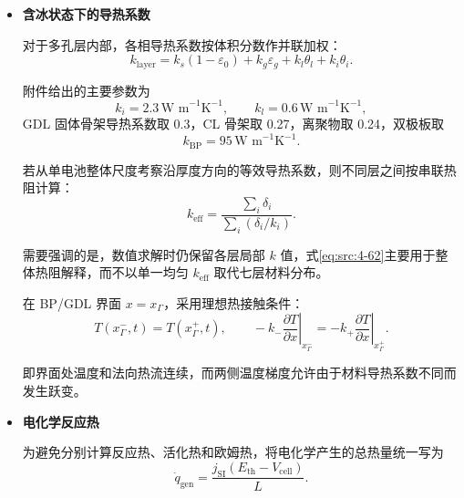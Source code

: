 \documentclass[bwprint]{gmcmthesis}
\numberwithin{equation}{section}
\numberwithin{figure}{section}
\begin{document}
\begin{itemize}
于是两侧双极板合计单位面积热容以及单电池完整热域单位面积热容分别为
\[
C_{A,2\text{BP}} = 2 L_{\text{BP}} (\rho c_p)_{\text{BP}} = 6066.72 \, \text{J m}^{-2}\text{K}^{-1},
\]
\begin{equation}
C_{A,\text{cell}}(t) = C_{A,2\text{BP}} + \int_{\Omega_{\text{MEA}}} (\rho c_p)_{\text{eff}}(x,t) \, \mathrm{d}x. \label{eq:src:4-60}
\end{equation}

其中 MEA 部分热容随局部水、冰状态变化，而双极板热容由固定材料参数决定。


\item \textbf {含冰状态下的导热系数}

对于多孔层内部，各相导热系数按体积分数作并联加权：
\begin{equation}
k_{\text{layer}} = k_s(1 - \varepsilon_0) + k_g \varepsilon_g + k_l \theta_l + k_i \theta_i. \label{eq:src:4-61}
\end{equation}

附件给出的主要参数为
\[
k_i = 2.3 \, \text{W m}^{-1}\text{K}^{-1}, \qquad k_l = 0.6 \, \text{W m}^{-1}\text{K}^{-1},
\]
GDL 固体骨架导热系数取 0.3，CL 骨架取 0.27，离聚物取 0.24，双极板取
\[
k_{\text{BP}} = 95 \, \text{W m}^{-1}\text{K}^{-1}.
\]

若从单电池整体尺度考察沿厚度方向的等效导热系数，则不同层之间按串联热阻计算：
\begin{equation}
k_{\text{eff}} = \frac{\sum\limits_i \delta_i}{\sum\limits_i (\delta_i / k_i)}. \label{eq:src:4-62}
\end{equation}

需要强调的是，数值求解时仍保留各层局部 \(k\) 值，式\eqref{eq:src:4-62}主要用于整体热阻解释，而不以单一均匀 \(k_{\text{eff}}\) 取代七层材料分布。

在 BP/GDL 界面 \(x = x_\Gamma\)，采用理想热接触条件：
\begin{equation}
T(x_\Gamma^-, t) = T(x_\Gamma^+, t), \qquad -k_- \left.\frac{\partial T}{\partial x}\right|_{x_\Gamma^-} = -k_+ \left.\frac{\partial T}{\partial x}\right|_{x_\Gamma^+}. \label{eq:src:4-63}
\end{equation}

即界面处温度和法向热流连续，而两侧温度梯度允许由于材料导热系数不同而发生跃变。

\item \textbf {电化学反应热}

为避免分别计算反应热、活化热和欧姆热，将电化学产生的总热量统一写为
\begin{equation}
\dot{q}_{\text{gen}} = \frac{j_{\mathrm{SI}}(E_{\text{th}} - V_{\text{cell}})}{L}. \label{eq:src:4-64}
\end{equation}


\end{itemize}
\end{document}
